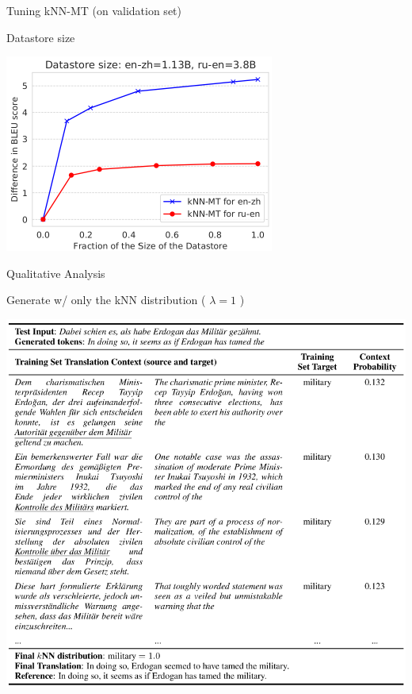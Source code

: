 \documentclass[unicode, 12pt, xdvipdfmx, aspectratio=169]{beamer}
\begin{document}
\begin{frame}[label={sec:orge7c05ab}]{Tuning kNN-MT (on validation set)}
\begin{block}{Datastore size}
\begin{center}
\includegraphics[width=0.5\linewidth]{./figure/Figure3.pdf}
\end{center}
\end{block}
\end{frame}

\begin{frame}[label={sec:org31ce93f}]{Qualitative Analysis}
\vspace{-0.2cm}
\begin{block}{Generate w/ only the kNN distribution ( \(\lambda = 1\) )}
\vspace{-0.5cm}
\begin{center}
\includegraphics[width=0.5\linewidth]{./figure/Figure4.pdf}
\end{center}
\end{block}
\end{frame}
\end{document}
